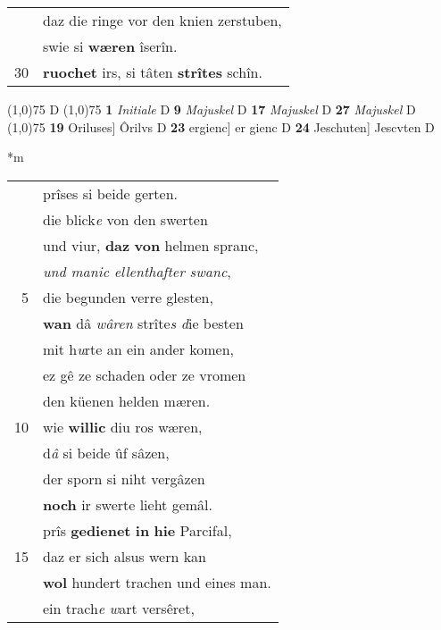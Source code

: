 \documentclass[8pt,a4paper,notitlepage]{article}
\begin{document}
\begin{table}[ht]
\begin{minipage}[t]{0.5\linewidth}
\begin{tabular}{rl}
 & daz die ringe vor den knien zerstuben,\\ 
 & swie si \textbf{wæren} îserîn.\\ 
30 & \textbf{ruochet} irs, si tâten \textbf{strîtes} schîn.\\ 
\end{tabular}
\scriptsize
\line(1,0){75} \newline
D \newline
\line(1,0){75} \newline
\textbf{1} \textit{Initiale} D  \textbf{9} \textit{Majuskel} D  \textbf{17} \textit{Majuskel} D  \textbf{27} \textit{Majuskel} D  \newline
\line(1,0){75} \newline
\textbf{19} Oriluses] Ôrilvs D \textbf{23} ergienc] er gienc D \textbf{24} Jeschuten] Jescvten D \newline
\end{minipage}
\hspace{0.5cm}
\begin{minipage}[t]{0.5\linewidth}
\small
\begin{center}*m
\end{center}
\begin{tabular}{rl}
 & prîses si beide gerten.\\ 
 & die blick\textit{e} von den swerten\\ 
 & und viur, \textbf{daz} \textbf{von} helmen spranc,\\ 
 & \textit{und manic ellenthafter swanc},\\ 
5 & die begunden verre glesten,\\ 
 & \textbf{wan} dâ \textit{wâren} strîte\textit{s d}ie besten\\ 
 & mit h\textit{u}rte an ein ander komen,\\ 
 & ez gê ze schaden oder ze vromen\\ 
 & den küenen helden mæren.\\ 
10 & wie \textbf{willic} diu ros wæren,\\ 
 & d\textit{â} si beide ûf sâzen,\\ 
 & der sporn si niht vergâzen\\ 
 & \textbf{noch} ir swerte lieht gemâl.\\ 
 & prîs \textbf{gedienet} \textbf{in} \textbf{hie} Parcifal,\\ 
15 & daz er sich alsus wern kan\\ 
 & \textbf{wol} hundert trachen und eines man.\\ 
 & ein trach\textit{e} \textit{w}art versêret,\\ 

\end{tabular}
\end{minipage}
\end{table}
\end{document}
